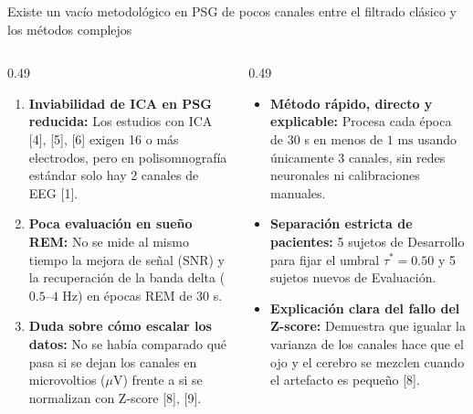 \documentclass[aspectratio=169,9pt]{beamer}
\begin{document}
\begin{frame}{Existe un vac\'io metodol\'ogico en PSG de pocos canales entre el filtrado cl\'asico y los m\'etodos complejos}
  \begin{columns}[T,onlytextwidth]
    \begin{column}{0.49\textwidth}
      \begin{tcolorbox}[redcard, title={\scriptsize\bfseries Tres Brechas Identificadas en la Literatura}, colbacktitle=UDTerracotta!85!black, coltitle=white]
        \scriptsize
        \begin{enumerate}
          \item \textbf{Inviabilidad de ICA en PSG reducida:} Los estudios con ICA [4], [5], [6] exigen 16 o m\'as electrodos, pero en polisomnograf\'ia est\'andar solo hay 2 canales de EEG [1].
          \item \textbf{Poca evaluaci\'on en sue\~no REM:} No se mide al mismo tiempo la mejora de se\~nal ($\text{SNR}$) y la recuperaci\'on de la banda delta ($0.5\text{--}4\text{ Hz}$) en \'epocas REM de 30 s.
          \item \textbf{Duda sobre c\'omo escalar los datos:} No se hab\'ia comparado qu\'e pasa si se dejan los canales en microvoltios ($\mu\text{V}$) frente a si se normalizan con Z-score [8], [9].
        \end{enumerate}
      \end{tcolorbox}
    \end{column}
    \begin{column}{0.49\textwidth}
      \begin{tcolorbox}[tealcard, title={\scriptsize\bfseries Aporte Pr\'actico de Nuestra Prueba de Concepto}, colbacktitle=UDTeal!85!black, coltitle=white]
        \scriptsize
        \begin{itemize}
          \item \textbf{M\'etodo r\'apido, directo y explicable:} Procesa cada \'epoca de 30 s en menos de $1\text{ ms}$ usando \'unicamente 3 canales, sin redes neuronales ni calibraciones manuales.
          \item \textbf{Separaci\'on estricta de pacientes:} 5 sujetos de Desarrollo para fijar el umbral $\tau^*=0.50$ y 5 sujetos nuevos de Evaluaci\'on.
          \item \textbf{Explicaci\'on clara del fallo del Z-score:} Demuestra que igualar la varianza de los canales hace que el ojo y el cerebro se mezclen cuando el artefacto es peque\~no [8].
        \end{itemize}
      \end{tcolorbox}
    \end{column}
  \end{columns}
\end{frame}
\end{document}
